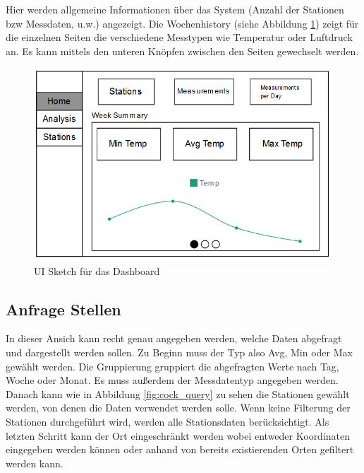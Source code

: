 Hier werden allgemeine Informationen über das System (Anzahl der Stationen bzw Messdaten, u.w.) angezeigt. Die Wochenhistory (siehe Abbildung \ref{fig:cock_dash}) zeigt für die einzelnen Seiten die verschiedene Messtypen wie Temperatur oder Luftdruck an. Es kann mittels den unteren Knöpfen zwischen den Seiten gewechselt werden.

\begin{figure}[H]
\centering
\includegraphics[width=1\textwidth]{pictures/sketches/cockpit/cockpit_home.png}
\caption{UI Sketch für das Dashboard}
\label{fig:cock_dash}
\end{figure}
\raggedright
\newpage

\subsection{Anfrage Stellen}
In dieser Ansich kann recht genau angegeben werden, welche Daten abgefragt und dargestellt werden sollen. Zu Beginn muss der Typ also Avg, Min oder Max gewählt werden. Die Gruppierung gruppiert die abgefragten Werte nach Tag, Woche oder Monat. Es muss außerdem der Messdatentyp angegeben werden. Danach kann wie in Abbildung \ref{fig:cock_query} zu sehen die Stationen gewählt werden, von denen die Daten verwendet werden solle. Wenn keine Filterung der Stationen durchgeführt wird, werden alle Stationsdaten berücksichtigt. Als letzten Schritt kann der Ort eingeschränkt werden wobei entweder Koordinaten eingegeben werden können oder anhand von bereits existierenden Orten gefiltert werden kann.

